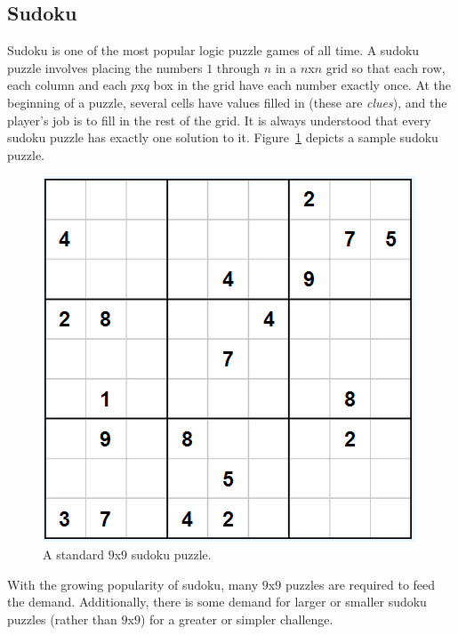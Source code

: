 \subsection{Sudoku}
Sudoku is one of the most popular logic puzzle games of all time. A sudoku puzzle involves placing the numbers $1$ through $n$ in
a $n$x$n$ grid so that each row, each column and each $p$x$q$ box in the grid have each number exactly once. At the beginning of
a puzzle, several cells have values filled in (these are \textit{clues}), and the player's job is to fill in the rest of the grid.
It is always understood that every sudoku puzzle has exactly one solution to it. Figure~\ref{fig:sudoku} depicts a sample sudoku puzzle.
\begin{figure}[H]
    \centering
    \includegraphics[scale=0.67]{sudoku.png}
    \caption{A standard $9$x$9$ sudoku puzzle.}
    \label{fig:sudoku}
\end{figure}

With the growing popularity of sudoku, many $9$x$9$ puzzles are required to feed the demand. Additionally, there is some demand
for larger or smaller sudoku puzzles (rather than $9$x$9$) for a greater or simpler challenge.

